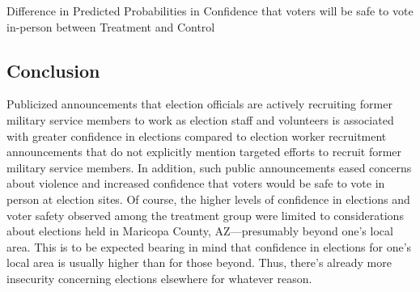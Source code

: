 \documentclass[
  12pt,
  letterpaper,
]{article}
\begin{document}
\begin{table}

\caption{\label{tbl-preds-diff2}Difference in Predicted Probabilities in
Confidence that voters will be safe to vote in-person between Treatment
and Control}


\end{table}%

\newpage

\subsection{Conclusion}\label{conclusion}

Publicized announcements that election officials are actively recruiting
former military service members to work as election staff and volunteers
is associated with greater confidence in elections compared to election
worker recruitment announcements that do not explicitly mention targeted
efforts to recruit former military service members. In addition, such
public announcements eased concerns about violence and increased
confidence that voters would be safe to vote in person at election
sites. Of course, the higher levels of confidence in elections and voter
safety observed among the treatment group were limited to considerations
about elections held in Maricopa County, AZ---presumably beyond one's
local area. This is to be expected bearing in mind that confidence in
elections for one's local area is usually higher than for those beyond.
Thus, there's already more insecurity concerning elections elsewhere for
whatever reason.
\end{document}
